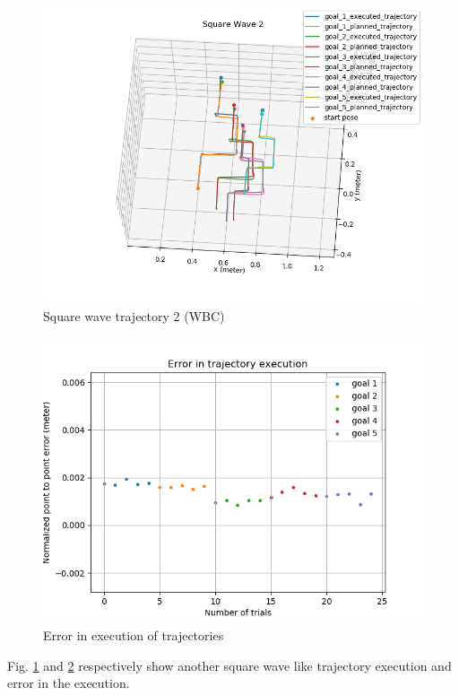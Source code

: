 \begin{figure}[H]
	\centering
	\includegraphics[scale=0.58]{images/2/wbc.png}
	\caption{Square wave trajectory 2 (WBC)}
	\label{fig:square_wbc_2}
\end{figure}


\begin{figure}[H]
	\centering
	\includegraphics[scale=0.6]{images/2/wbc_e.png}
	\caption{Error in execution of trajectories}
	\label{fig:square_wbc_2_e}
\end{figure}
Fig. \ref{fig:square_wbc_2} and \ref{fig:square_wbc_2_e} respectively show another square wave like trajectory execution and error in the execution.


